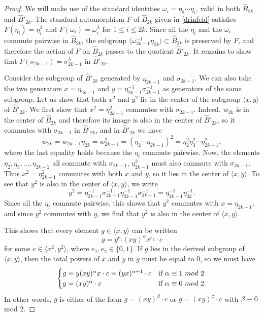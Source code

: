 \documentclass[a4paper,10pt,reqno]{amsart}
\newcommand\B{\widehat{B}}
\begin{document}
\begin{proof}

 We will make use of the standard identities $\omega_i=\eta_2\cdots \eta_i$,
valid in both $\B_{2k}$ and $\B'_{2k}$. The standard automorphism $F$ of 
$\B_{2k}$ given in \eqref{drinfeld} satisfies $F(\eta_i)=\eta_i^\lambda$
and $F(\omega_i)=\omega_i^\lambda$ for $1\le i\le 2k$. Since all the
$\eta_i$ and the $\omega_i$ commute pairwise in $\B_{2k}$, the subgroup
$\langle \omega_{2k-1}^{-1}\eta_{2k}\rangle\subset \B_{2k}$ is preserved by
$F$, and therefore the action of $F$ on $\B_{2k}$ passes to the
quotient $\B'_{2k}$. It remains to show that $F(\sigma_{2k-1})=
\sigma_{2k-1}^\lambda$ in $\B'_{2k}$.

Consider the subgroup of $\B'_{2k}$ generated by $\eta_{2k-1}$ and $\sigma_{2k-1}$.
We can also take the two generators $x=\eta_{2k-1}$ and $y=\eta_{2k-1}^{-1}\sigma_{2k-1}^{-1}$ 
as generators of the same subgroup. Let us show that both 
$x^2$ and $y^2$ lie in the center of the subgroup $\langle x,y\rangle$
of $\B'_{2k}$. We first show that $x^2=\eta_{2k-1}^2$ commutes with
$\sigma_{2k-1}$. Indeed, $w_{2k}$ is in the center of $\B_{2k}$ and
therefore its image is also in the center of $\B'_{2k}$, so it commutes
with $\sigma_{2k-1}$ in $\B'_{2k}$, and in $\B'_{2k}$ we have
$$w_{2k}=w_{2k-1}\eta_{2k}=w_{2k-1}^2=
(\eta_2\cdots \eta_{2k-1})^2=\eta_2^2\eta_3^2\cdots \eta_{2k-1}^2,$$
where the last equality holds because the $\eta_i$ commute pairwise. Now,
the elements $\eta_2,\eta_3,\ldots,\eta_{2k-2}$ all commute with $\sigma_{2k-1}$,
$\eta_{2k-1}^2$ must also commute with $\sigma_{2k-1}$. Thus $x^2=\eta_{2k-1}^2$
commutes with both $x$ and $y$, so it lies in the center of 
$\langle x,y\rangle$. To see that $y^2$ is also in the center of 
$\langle x,y\rangle$, we write
$$y^2=\eta_{2k-1}^{-1}\sigma_{2k-1}^{-1}\eta_{2k-1}^{-1}\sigma_{2k-1}^{-1}=
\eta_{2k-1}^{-1}\eta_{2k}^{-1}.$$
Since all the $\eta_i$ commute pairwise, this shows that $y^2$ commutes with 
$x=\eta_{2k-1}$, and since $y^2$ commutes with $y$, we find that $y^2$
is also in the center of $\langle x,y\rangle$. 

This shows that every element $g\in \langle x,y\rangle$ can be written
$$g=y^{e_1}(xy)^\alpha x^{e_2}\cdot c$$
for some $c\in \langle x^2,y^2\rangle$, where $e_1,e_2\in \{0,1\}$.
If $g$ lies in the derived subgroup of $\langle x,y\rangle$, then the
total powers of $x$ and $y$ in $g$ must be equal to $0$, so we must have
\begin{equation}\label{alpha}
\begin{cases}
g=y(xy)^\alpha x\cdot c=(yx)^{\alpha+1}\cdot c&\hbox{if }\alpha\equiv 1\ mod\ 2\\
g=(xy)^\alpha\cdot c&\hbox{if }\alpha\equiv 0\ mod\ 2.
\end{cases}
\end{equation}
In other words, $g$ is either of the form $g=(xy)^\beta\cdot c$ or 
$g=(xy)^\beta\cdot c$ with $\beta\equiv 0$ mod 2.


\end{proof}
\end{document}
